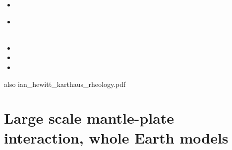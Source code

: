 \begin{small}
\begin{itemize}
 \\
\item[\twothousandeighteen] 
 \\
\item[\twothousandnineteen] 
 \\
 \\
\item[\twothousandtwenty] 
\item[\twothousandtwentyone] 
\item[\twothousandtwentyfour]
\end{itemize}
\end{small}


also ian\_hewitt\_karthaus\_rheology.pdf

\section{Large scale mantle-plate interaction, whole Earth models}

